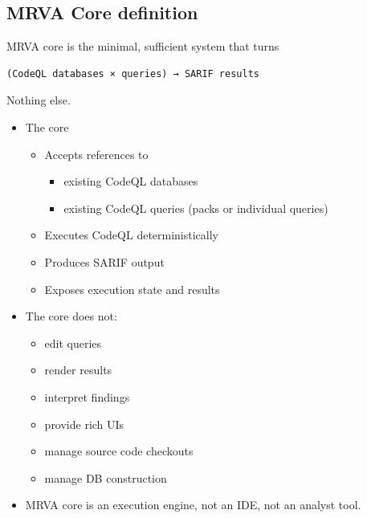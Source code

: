 \documentclass[11pt]{article}
\begin{document}
\subsection{MRVA Core definition}
\label{sec:org67b83e3}
MRVA core is the minimal, sufficient system that turns
\begin{verbatim}
(CodeQL databases × queries) → SARIF results
\end{verbatim}

Nothing else.

\begin{itemize}
\item The core
\begin{itemize}
\item Accepts references to
\begin{itemize}
\item existing CodeQL databases
\item existing CodeQL queries (packs or individual queries)
\end{itemize}
\item Executes CodeQL deterministically
\item Produces SARIF output
\item Exposes execution state and results
\end{itemize}

\item The core does not:
\begin{itemize}
\item edit queries
\item render results
\item interpret findings
\item provide rich UIs
\item manage source code checkouts
\item manage DB construction
\end{itemize}

\item MRVA core is an execution engine, not an IDE, not an analyst tool.
\end{itemize}
\end{document}
